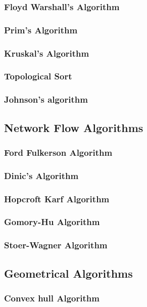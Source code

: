 \documentclass[10pt,landscape,twocolumn]{article}
\begin{document}
\subsubsection{Floyd Warshall's Algorithm}
\subsubsection{Prim's Algorithm}
\subsubsection{Kruskal's Algorithm}
\subsubsection{Topological Sort}
\subsubsection{Johnson's algorithm}


\subsection{Network Flow Algorithms}
\subsubsection{Ford Fulkerson Algorithm}
\subsubsection{Dinic's Algorithm}
\subsubsection{Hopcroft Karf Algorithm}
\subsubsection{Gomory-Hu Algorithm}
\subsubsection{Stoer-Wagner Algorithm}

\subsection{Geometrical Algorithms}
\subsubsection{Convex hull Algorithm}
\end{document}
